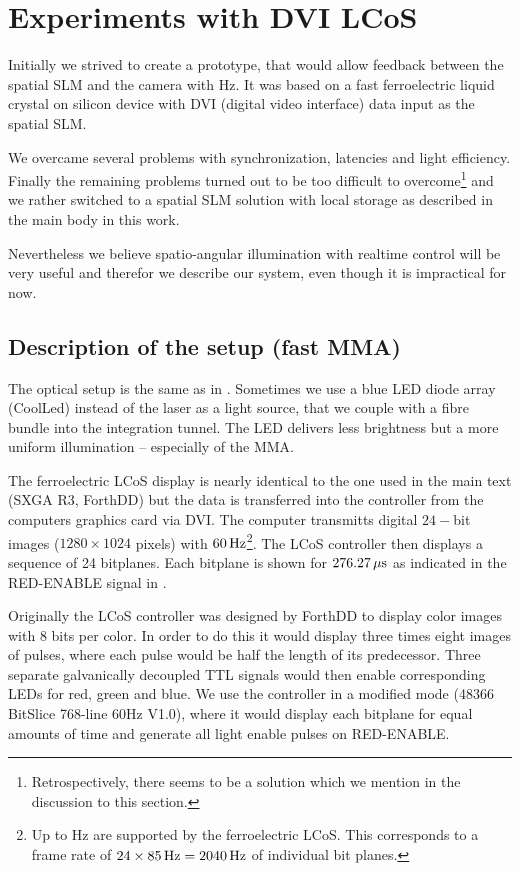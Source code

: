 \chapter{Experiments with DVI LCoS}
\begin{summary}
  Initially we strived to create a prototype, that would allow
  feedback between the spatial SLM and the camera with
  \unit[60]{Hz}. It was based on a fast ferroelectric liquid crystal
  on silicon device with DVI (digital video interface) data input as
  the spatial SLM.
  
  We overcame several problems with synchronization, latencies and
  light efficiency. Finally the remaining problems turned out to be
  too difficult to overcome\footnote{Retrospectively, there seems to
    be a solution which we mention in the discussion to this section.}
  and we rather switched to a spatial SLM solution with local storage
  as described in the main body in this work.

  Nevertheless we believe spatio-angular illumination with realtime
  control will be very useful and therefor we describe our system,
  even though it is impractical for now.
\end{summary}

\section{Description of the setup (fast MMA)}
The optical setup is the same as in . Sometimes
we use a blue LED diode array (CoolLed) instead of the laser as a
light source, that we couple with a fibre bundle into the integration
tunnel. The LED delivers less brightness but a more uniform
illumination -- especially of the MMA.

The ferroelectric LCoS display is nearly identical to the one used in
the main text (SXGA R3, ForthDD) but the data is transferred into the
controller from the computers graphics card via DVI. The computer
transmitts digital $24-$bit images ($1280\times1024$ pixels) with
$\unit[60]{Hz}$\footnote{Up to \unit[85]{Hz} are supported by the
  ferroelectric LCoS. This corresponds to a frame rate of
  $24\times\unit[85]{Hz}=\unit[2040]{Hz}$ of individual bit
  planes.}. The LCoS controller then displays a sequence of 24
bitplanes. Each bitplane is shown for $\unit[276.27]{\mu s}$ as
indicated in the \textsf{RED-ENABLE} signal in .

Originally the LCoS controller was designed by ForthDD to display
color images with 8 bits per color. In order to do this it would
display three times eight images of pulses, where each pulse would be
half the length of its predecessor. Three separate galvanically
decoupled TTL signals would then enable corresponding LEDs for red,
green and blue. We use the controller in a modified mode (48366
BitSlice 768-line 60Hz V1.0), where it would display each bitplane for
equal amounts of time and generate all light enable pulses on
\textsf{RED-ENABLE}.

